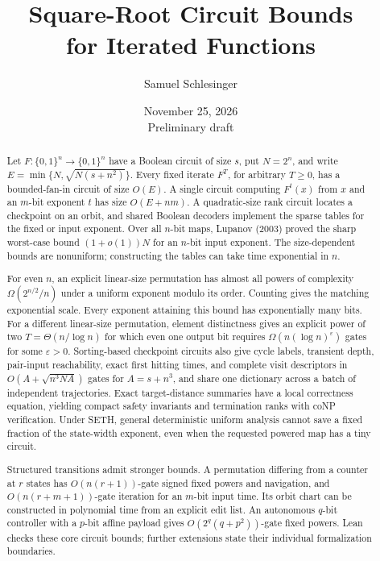 \documentclass[11pt]{article}
\title{Square-Root Circuit Bounds\\for Iterated Functions}
\author{Samuel Schlesinger}
\date{November 25, 2026\\[3pt]\small Preliminary draft}
\theoremstyle{definition}
\theoremstyle{remark}
\newcommand{\bits}{\{0,1\}}
\numberwithin{equation}{section}
\begin{document}
\maketitle

\begin{abstract}
Let $F:\bits^n\to\bits^n$ have a Boolean circuit of size $s$, put
$N=2^n$, and write $E=\min\{N,\sqrt{N(s+n^2)}\}$. Every fixed iterate
$F^T$, for arbitrary $T\ge0$, has a bounded-fan-in circuit of size
$O(E)$. A single circuit computing $F^t(x)$ from $x$ and an $m$-bit
exponent $t$ has size $O(E+nm)$. A quadratic-size rank circuit locates
a checkpoint on an orbit, and shared Boolean decoders implement the
sparse tables for the fixed or input exponent. Over all $n$-bit maps,
Lupanov (2003) proved the sharp worst-case bound $(1+o(1))N$ for an
$n$-bit input exponent. The size-dependent bounds are nonuniform;
constructing the tables can take time exponential in $n$.

For even $n$, an explicit linear-size permutation has almost all powers of
complexity $\Omega(2^{n/2}/n)$ under a uniform exponent modulo its order.
Counting gives the matching exponential scale. Every exponent attaining
this bound has exponentially many bits. For a different linear-size
permutation, element distinctness gives an explicit power of two
$T=\Theta(n/\log n)$ for which even one output bit requires
$\Omega(n(\log n)^\varepsilon)$ gates for some $\varepsilon>0$.
Sorting-based checkpoint circuits also give cycle labels, transient
depth, pair-input reachability, exact first hitting times, and complete visit
descriptors in $O(A+\sqrt{n^3NA})$ gates for $A=s+n^3$, and share one
dictionary across a batch of independent trajectories.  Exact
target-distance summaries have a local correctness equation, yielding
compact safety invariants and termination ranks with coNP verification.
Under SETH, general deterministic uniform analysis cannot save a fixed fraction of the
state-width exponent, even when the requested powered map has a tiny circuit.

Structured transitions admit stronger bounds.  A permutation differing from
a counter at $r$ states has $O(n(r+1))$-gate signed fixed powers and navigation,
and $O(n(r+m+1))$-gate iteration for an $m$-bit input time.  Its orbit chart
can be constructed in polynomial time from an explicit edit list.  An
autonomous $q$-bit controller with a $p$-bit affine payload gives
$O(2^q(q+p^2))$-gate fixed powers.  Lean checks these core circuit bounds;
further extensions state their individual formalization boundaries.
\end{abstract}
\end{document}
